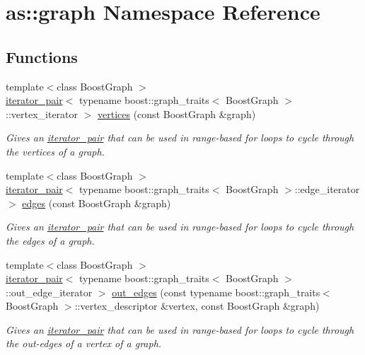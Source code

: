 \hypertarget{namespaceas_1_1graph}{}\section{as\+:\+:graph Namespace Reference}
\label{namespaceas_1_1graph}
\subsection*{Functions}
\begin{DoxyCompactItemize}
\item 
{\footnotesize template$<$class Boost\+Graph $>$ }\\\hyperlink{classas_1_1iterator__pair}{iterator\+\_\+pair}$<$ typename boost\+::graph\+\_\+traits$<$ Boost\+Graph $>$\+::vertex\+\_\+iterator $>$ \hyperlink{namespaceas_1_1graph_ab93ee208eb116d3a3349c8de8cc91445}{vertices} (const Boost\+Graph \&graph)
\begin{DoxyCompactList}\small\item\em Gives an \hyperlink{classas_1_1iterator__pair}{iterator\+\_\+pair} that can be used in range-\/based for loops to cycle through the vertices of a graph. \end{DoxyCompactList}\item 
{\footnotesize template$<$class Boost\+Graph $>$ }\\\hyperlink{classas_1_1iterator__pair}{iterator\+\_\+pair}$<$ typename boost\+::graph\+\_\+traits$<$ Boost\+Graph $>$\+::edge\+\_\+iterator $>$ \hyperlink{namespaceas_1_1graph_ae44b728c4acaf47bc2bb010831df9452}{edges} (const Boost\+Graph \&graph)
\begin{DoxyCompactList}\small\item\em Gives an \hyperlink{classas_1_1iterator__pair}{iterator\+\_\+pair} that can be used in range-\/based for loops to cycle through the edges of a graph. \end{DoxyCompactList}\item 
{\footnotesize template$<$class Boost\+Graph $>$ }\\\hyperlink{classas_1_1iterator__pair}{iterator\+\_\+pair}$<$ typename boost\+::graph\+\_\+traits$<$ Boost\+Graph $>$\+::out\+\_\+edge\+\_\+iterator $>$ \hyperlink{namespaceas_1_1graph_a00143e178e97f0e9787802953d74a9f7}{out\+\_\+edges} (const typename boost\+::graph\+\_\+traits$<$ Boost\+Graph $>$\+::vertex\+\_\+descriptor \&vertex, const Boost\+Graph \&graph)
\begin{DoxyCompactList}\small\item\em Gives an \hyperlink{classas_1_1iterator__pair}{iterator\+\_\+pair} that can be used in range-\/based for loops to cycle through the out-\/edges of a vertex of a graph. \end{DoxyCompactList}\item 

\end{DoxyCompactItemize}
